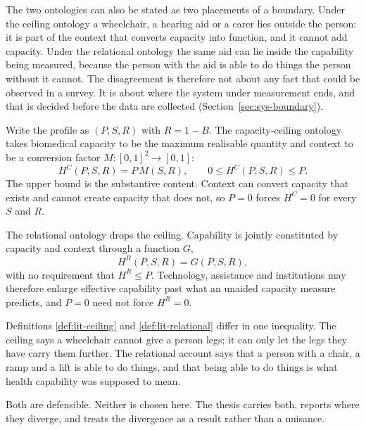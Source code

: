 The two ontologies can also be stated as two placements of a boundary. Under
the ceiling ontology a wheelchair, a hearing aid or a carer lies outside the
person: it is part of the context that converts capacity into function, and it
cannot add capacity. Under the relational ontology the same aid can lie inside
the capability being measured, because the person with the aid is able to do
things the person without it cannot. The disagreement is therefore not about
any fact that could be observed in a survey. It is about where the system
under measurement ends, and that is decided before the data are collected
(Section~\ref{sec:sys-boundary}).

\begin{definition}
\label{def:lit-ceiling}
Write the profile as $(P,S,R)$ with $R=1-B$. The capacity-ceiling ontology
takes biomedical capacity to be the maximum realisable quantity and context to
be a conversion factor $M:[0,1]^2\rightarrow[0,1]$:
\[
  H^{C}(P,S,R)=P\,M(S,R),\qquad 0\le H^{C}(P,S,R)\le P .
\]
The upper bound is the substantive content. Context can convert capacity that
exists and cannot create capacity that does not, so $P=0$ forces $H^{C}=0$ for
every $S$ and $R$.
\end{definition}

\begin{definition}
\label{def:lit-relational}
The relational ontology drops the ceiling. Capability is jointly constituted by
capacity and context through a function $G$,
\[
  H^{R}(P,S,R)=G(P,S,R),
\]
with no requirement that $H^{R}\le P$. Technology, assistance and institutions
may therefore enlarge effective capability past what an unaided capacity
measure predicts, and $P=0$ need not force $H^{R}=0$.
\end{definition}

\begin{reading}
Definitions \ref{def:lit-ceiling} and \ref{def:lit-relational} differ in one
inequality. The ceiling says a wheelchair cannot give a person legs; it can
only let the legs they have carry them further. The relational account says
that a person with a chair, a ramp and a lift is able to do things, and that
being able to do things is what health capability was supposed to mean.

Both are defensible. Neither is chosen here. The thesis carries both, reports
where they diverge, and treats the divergence as a result rather than a
nuisance.
\end{reading}

